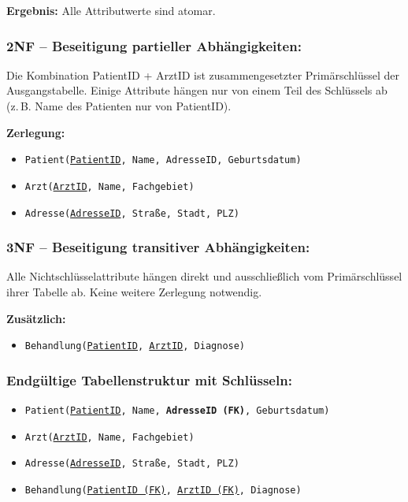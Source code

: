 \documentclass[a4paper,12pt]{article}
\begin{document}
\begin{enumerate}
	\vspace{0.5em}
	\textbf{Ergebnis:}
	Alle Attributwerte sind atomar.
	
	\subsubsection*{2NF – Beseitigung partieller Abhängigkeiten:}
	Die Kombination PatientID + ArztID ist zusammengesetzter Primärschlüssel der Ausgangstabelle.  
	Einige Attribute hängen nur von einem Teil des Schlüssels ab (z.\,B. Name des Patienten nur von PatientID).
	
	\vspace{0.5em}
	\textbf{Zerlegung:}
	\begin{itemize}
		\item \texttt{Patient(\underline{PatientID}, Name, AdresseID, Geburtsdatum)}
		\item \texttt{Arzt(\underline{ArztID}, Name, Fachgebiet)}
		\item \texttt{Adresse(\underline{AdresseID}, Straße, Stadt, PLZ)}
	\end{itemize}
	
	\subsubsection*{3NF – Beseitigung transitiver Abhängigkeiten:}
	Alle Nichtschlüsselattribute hängen direkt und ausschließlich vom Primärschlüssel ihrer Tabelle ab.  
	\textrightarrow{} Keine weitere Zerlegung notwendig.
	
	\vspace{0.5em}
	\textbf{Zusätzlich:}
	\begin{itemize}
		\item \texttt{Behandlung(\underline{PatientID}, \underline{ArztID}, Diagnose)}
	\end{itemize}
	
	\subsubsection*{Endgültige Tabellenstruktur mit Schlüsseln:}
	
	\begin{itemize}
		\item \texttt{Patient(\underline{PatientID}, Name, \textbf{AdresseID (FK)}, Geburtsdatum)}
		\item \texttt{Arzt(\underline{ArztID}, Name, Fachgebiet)}
		\item \texttt{Adresse(\underline{AdresseID}, Straße, Stadt, PLZ)}
		\item \texttt{Behandlung(\underline{PatientID (FK)}, \underline{ArztID (FK)}, Diagnose)}
	\end{itemize}
	

\end{enumerate}
\end{document}
